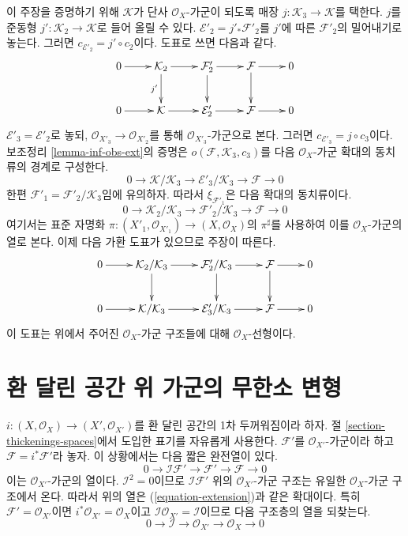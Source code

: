 \begin{remark}
\medskip\noindent
이 주장을 증명하기 위해 $\mathcal{K}$가 단사 $\mathcal{O}_X$-가군이
되도록 매장 $j:\mathcal{K}_3\to\mathcal{K}$를 택한다. $j$를 준동형
$j':\mathcal{K}_2\to\mathcal{K}$로 들어 올릴 수 있다.
$\mathcal{E}'_2=j'_*\mathcal{F}'_2$를 $j'$에 따른
$\mathcal{F}'_2$의 밀어내기로 놓는다. 그러면
$c_{\mathcal{E}'_2}=j'\circ c_2$이다. 도표로 쓰면 다음과 같다.
$$
\xymatrix{
0 \ar[r] &
\mathcal{K}_2 \ar[r] \ar[d]_{j'} &
\mathcal{F}'_2 \ar[r] \ar[d] &
\mathcal{F} \ar[r] \ar[d] & 0 \\
0 \ar[r] &
\mathcal{K} \ar[r] &
\mathcal{E}'_2 \ar[r] &
\mathcal{F} \ar[r] & 0
}
$$
$\mathcal{E}'_3=\mathcal{E}'_2$로 놓되,
$\mathcal{O}_{X'_3}\to\mathcal{O}_{X'_2}$를 통해
$\mathcal{O}_{X'_3}$-가군으로 본다. 그러면
$c_{\mathcal{E}'_3}=j\circ c_3$이다. 보조정리
\ref{lemma-inf-obs-ext}의 증명은 $o(\mathcal{F},\mathcal{K}_3,c_3)$를
다음 $\mathcal{O}_X$-가군 확대의 동치류의 경계로 구성한다.
$$
0 \to
\mathcal{K}/\mathcal{K}_3 \to
\mathcal{E}'_3/\mathcal{K}_3 \to
\mathcal{F} \to 0
$$
한편 $\mathcal{F}'_1=\mathcal{F}'_2/\mathcal{K}_3$임에 유의하자.
따라서 $\xi_{\mathcal{F}'_1}$은 다음 확대의 동치류이다.
$$
0 \to \mathcal{K}_2/\mathcal{K}_3 \to \mathcal{F}'_2/\mathcal{K}_3
\to \mathcal{F} \to 0
$$
여기서는 표준 자명화
$\pi:(X'_1,\mathcal{O}_{X'_1})\to(X,\mathcal{O}_X)$의
$\pi^\sharp$를 사용하여 이를 $\mathcal{O}_X$-가군의 열로 본다.
이제 다음 가환 도표가 있으므로 주장이 따른다.
$$
\xymatrix{
0 \ar[r] &
\mathcal{K}_2/\mathcal{K}_3 \ar[r] \ar[d] &
\mathcal{F}'_2/\mathcal{K}_3 \ar[r] \ar[d] &
\mathcal{F} \ar[r] \ar[d] & 0 \\
0 \ar[r] &
\mathcal{K}/\mathcal{K}_3 \ar[r] &
\mathcal{E}'_3/\mathcal{K}_3 \ar[r] &
\mathcal{F} \ar[r] & 0
}
$$
이 도표는 위에서 주어진 $\mathcal{O}_X$-가군 구조들에 대해
$\mathcal{O}_X$-선형이다.
\end{remark}








\section{환 달린 공간 위 가군의 무한소 변형}
\label{section-deformation-modules}

\noindent
$i : (X, \mathcal{O}_X) \to (X', \mathcal{O}_{X'})$를 환 달린 공간의
1차 두꺼워짐이라 하자. 절 \ref{section-thickenings-spaces}에서 도입한
표기를 자유롭게 사용한다. $\mathcal{F}'$를 $\mathcal{O}_{X'}$-가군이라
하고 $\mathcal{F} = i^*\mathcal{F}'$라 놓자. 이 상황에서는 다음
짧은 완전열이 있다.
$$
0 \to \mathcal{I}\mathcal{F}' \to \mathcal{F}' \to \mathcal{F} \to 0
$$
이는 $\mathcal{O}_{X'}$-가군의 열이다. $\mathcal{I}^2 = 0$이므로
$\mathcal{I}\mathcal{F}'$ 위의 $\mathcal{O}_{X'}$-가군 구조는 유일한
$\mathcal{O}_X$-가군 구조에서 온다. 따라서 위의 열은
(\ref{equation-extension})과 같은 확대이다. 특히
$\mathcal{F}' = \mathcal{O}_{X'}$이면
$i^*\mathcal{O}_{X'} = \mathcal{O}_X$이고
$\mathcal{I}\mathcal{O}_{X'} = \mathcal{I}$이므로 다음 구조층의 열을
되찾는다.
$$
0 \to \mathcal{I} \to \mathcal{O}_{X'} \to \mathcal{O}_X \to 0
$$

